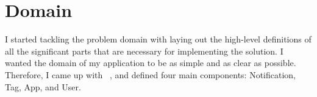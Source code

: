 \section{Domain}\label{sec:domain}

I started tackling the problem domain with laying out
the high-level definitions of all the significant parts
that are necessary for implementing the solution.
I wanted the domain of my application
to be as simple and as clear as possible.
Therefore,
I came up with
~\cite{evans_domain-driven_2003,millett_patterns_2015},
and defined four main components: Notification, Tag, App, and User.





